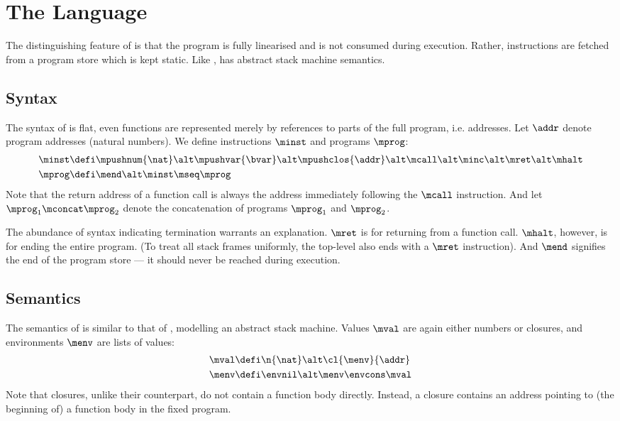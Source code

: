 \section{The \textnormal{\mlang} Language}

The distinguishing feature of \mlang is that the program is fully linearised and is not consumed during execution.
Rather, instructions are fetched from a program store which is kept static.
Like \slang, \mlang has abstract stack machine semantics.

\subsection{Syntax}

The syntax of \mlang is flat, even functions are represented merely by references to parts of the full program, i.e. addresses.
Let $\addr$ denote program addresses (natural numbers).
We define \mlang instructions $\minst$ and programs $\mprog$:
\begin{align*}
  \minst &\defi \mpushnum{\nat} \alt \mpushvar{\bvar} \alt \mpushclos{\addr} \alt \mcall \alt \minc \alt \mret \alt \mhalt \\
  \mprog &\defi \mend \alt \minst \mseq \mprog
\end{align*}
Note that the return address of a function call is always the address immediately following the $\mcall$ instruction.
And let $\mprog_1 \mconcat \mprog_2$ denote the concatenation of programs $\mprog_1$ and $\mprog_2$.

The abundance of syntax indicating termination warrants an explanation.
$\mret$ is for returning from a function call.
$\mhalt$, however, is for ending the entire program.
(To treat all stack frames uniformly, the top-level also ends with a $\mret$ instruction).
And $\mend$ signifies the end of the program store --- it should never be reached during execution.


\subsection{Semantics}

The semantics of \mlang is similar to that of \slang, modelling an abstract stack machine.
Values $\mval$ are again either numbers or closures, and environments $\menv$ are lists of values:
\begin{align*}
  \mval &\defi \n{\nat} \alt \cl{\menv}{\addr} \\
  \menv &\defi \envnil \alt \menv \envcons \mval
\end{align*}
Note that \mlang closures, unlike their \slang counterpart, do not contain a function body directly.
Instead, a closure contains an address pointing to (the beginning of) a function body in the fixed program.

